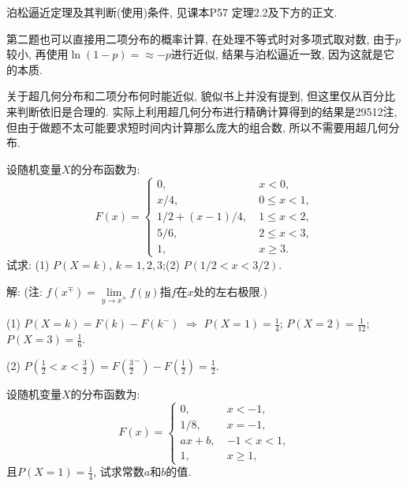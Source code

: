 \documentclass[standard]{ExBook}
\renewenvironment{shaded}{%
  \def\FrameCommand{\fboxsep=\FrameSep \colorbox{shadecolor}}%
  \MakeFramed{\advance\hsize-\width \FrameRestore}%
}{%
  \endMakeFramed
}
\begin{document}
\begin{qitems}
\textcolor{themeColor}{\selectfont {} 泊松逼近定理及其判断(使用)条件, 见课本P57 定理2.2及下方的正文.}

\textcolor{themeColor}{\selectfont {} 第二题也可以直接用二项分布的概率计算, 在处理不等式时对多项式取对数, 由于$p$较小, 再使用$\ln(1-p)=\approx-p$进行近似, 结果与泊松逼近一致, 因为这就是它的本质.}

\textcolor{themeColor}{\selectfont {} 关于超几何分布和二项分布何时能近似, 貌似书上并没有提到, 但这里仅从百分比来判断依旧是合理的. 实际上利用超几何分布进行精确计算得到的结果是29512注, 但由于做题不太可能要求短时间内计算那么庞大的组合数, 所以不需要用超几何分布.} 

\vspace{2.5cm-5em}

    \begin{bbox}
    \begin{shaded}
        \qitem
设随机变量$X$的分布函数为:
$$
    F(x)=
    \left\{
    \begin{array}{ll}
        0,\ &x < 0,\\
        x/4,\ &0 \leq x < 1,\\
        1/2+(x-1)/4,\ &1 \leq x < 2,\\
        5/6,\ &2 \leq x <3,\\
        1,\ &x \geq 3.
    \end{array}
    \right.
$$
试求: (1) $P(X=k)$, $k=1,2,3$;\qquad(2) $P(1/2<x<3/2)$.
    \end{shaded}
    \end{bbox}

\vspace{\dimexpr2.5cm-5em\relax}

解: (注: $f(x^\mp)=\lim\limits_{y\to x^\mp}f(y)$指$f$在$x$处的左右极限.)

(1) $P(X=k)=F(k)-F(k^{-})$ $\Longrightarrow$ $P(X=1)=\frac{1}{4}$; $P(X=2)=\frac{1}{12}$; $P(X=3)=\frac{1}{6}$.

(2) $P(\frac{1}{2}<x<\frac{3}{2})=F(\frac{3}{2}^-)-F(\frac{1}{2})=\frac{1}{2}$.

\vspace{2.5cm-5em}

    \begin{bbox}
    \begin{shaded}
        \qitem
设随机变量$X$的分布函数为:
$$
    F(x)=
    \left\{
    \begin{array}{ll}
        0,\ &x < -1,\\
        1/8,\ &x=-1,\\
        ax+b,\ &-1 < x < 1,\\
        1,\ &x \geq 1,
    \end{array}
    \right.
$$
且$P(X=1)=\displaystyle\frac{1}{4}$, 试求常数$a$和$b$的值.
    \end{shaded}
    \end{bbox}


\end{qitems}
\end{document}
